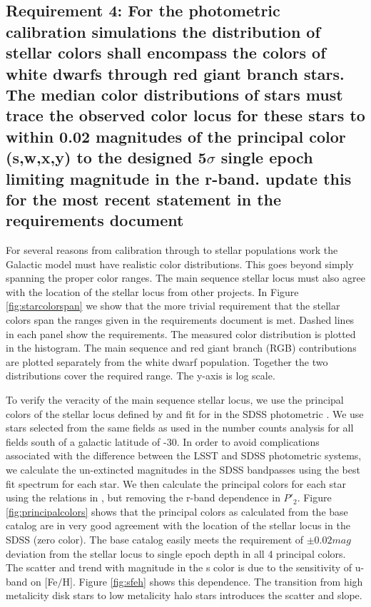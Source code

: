 \documentclass[]{article}
\begin{document}
\subsection{Requirement 4: For the photometric calibration simulations
the distribution of stellar colors shall encompass the colors of white dwarfs through red giant branch stars.
The median color distributions of stars must trace the observed color locus for these stars to within 0.02 magnitudes
of the principal color (s,w,x,y) to the designed 5$\sigma$ single epoch limiting magnitude in the r-band.
{\bf update this for the most recent statement in the requirements document}}
For several reasons from calibration through to stellar populations work the Galactic model must have realistic color distributions.
This goes beyond simply spanning the proper color ranges.  The main sequence stellar locus must also agree with the location of the
stellar locus from other projects.  In Figure \ref{fig:starcolorspan} we show that the more trivial requirement that the stellar
colors span the ranges given in the requirements document is met.  Dashed lines in each panel show the requirements.  The measured
color distribution is plotted in the histogram.  The main sequence and red giant branch (RGB) contributions are plotted separately from
the white dwarf population.  Together the two distributions cover the required range.  The y-axis is log scale.

To verify the veracity of the main sequence stellar locus, we use the principal colors of the stellar locus defined by \cite{helmi02} and 
fit for in the SDSS photometric \cite{ivezic04}.
We use stars selected from the same fields as used in the number counts analysis for all fields south of a galactic latitude of -30.
In order to avoid complications associated with the difference between the LSST and SDSS photometric systems, we calculate the un-extincted 
magnitudes in the SDSS bandpasses using the best fit spectrum for each star.  We then calculate
the principal colors for each star using the relations in \cite{ivezic04}, but removing the r-band dependence in $P\prime_{2}$.  Figure
\ref{fig:principalcolors} shows that the principal colors as calculated from the base catalog are in very good agreement with
the location of the stellar locus in the SDSS (zero color).  The base catalog easily meets the requirement of $\pm0.02mag$ deviation
from the stellar locus to single epoch depth in all 4 principal colors.  The scatter and trend with magnitude in the s color is due to 
the sensitivity of u-band on $[$Fe$/$H$]$.  Figure \ref{fig:sfeh} shows this dependence.  The transition from high metalicity disk stars to low 
metalicity halo stars introduces the scatter and slope.
\end{document}
